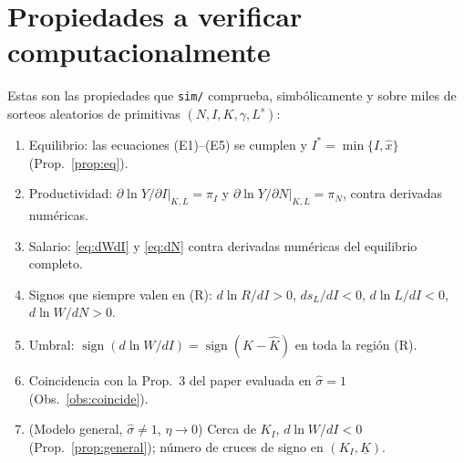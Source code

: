 \documentclass[11pt,a4paper]{article}
\numberwithin{equation}{section}
\theoremstyle{definition}
\theoremstyle{plain}
\theoremstyle{remark}
\newcommand{\Is}{I^{*}}
\newcommand{\Kl}{\underline K}
\newcommand{\Kh}{\hat K}
\newcommand{\sh}{\hat\sigma}
\begin{document}
\section{Propiedades a verificar computacionalmente}\label{sec:props}

Estas son las propiedades que \texttt{sim/} comprueba, simbólicamente y sobre miles de sorteos aleatorios de
primitivas $(N,I,K,\gamma,L^s)$:
\begin{enumerate}[label=\textbf{P\arabic*},nosep]
  \item Equilibrio: las ecuaciones (E1)–(E5) se cumplen y $\Is=\min\{I,\hat x\}$ (Prop.~\ref{prop:eq}).
  \item Productividad: $\partial\ln Y/\partial I|_{K,L}=\pi_I$ y $\partial\ln Y/\partial N|_{K,L}=\pi_N$, contra derivadas numéricas.
  \item Salario: \eqref{eq:dWdI} y \eqref{eq:dN} contra derivadas numéricas del equilibrio completo.
  \item Signos que siempre valen en (R): $d\ln R/dI>0$, $ds_L/dI<0$, $d\ln L/dI<0$, $d\ln W/dN>0$.
  \item Umbral: $\operatorname{sign}(d\ln W/dI)=\operatorname{sign}(K-\Kh)$ en toda la región (R).
  \item Coincidencia con la Prop.~3 del paper evaluada en $\sh=1$ (Obs.~\ref{obs:coincide}).
  \item (Modelo general, $\sh\ne1$, $\eta\to0$) Cerca de $K_I$, $d\ln W/dI<0$ (Prop.~\ref{prop:general}); número de cruces de signo en $(K_I,\Kl)$.
\end{enumerate}
\end{document}
